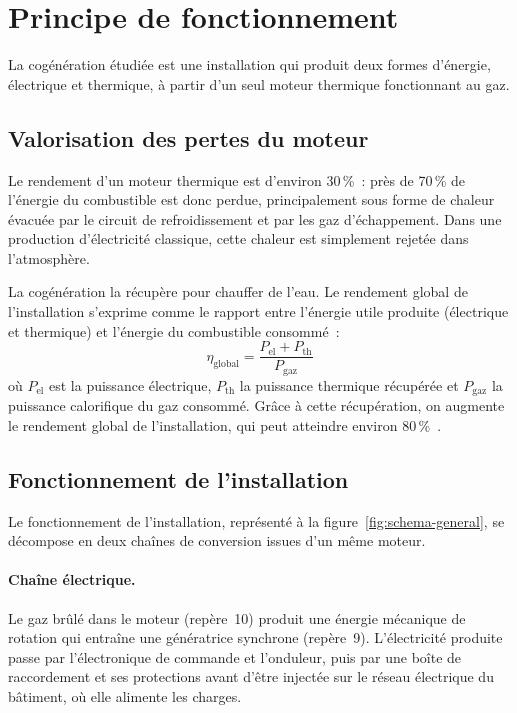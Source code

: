 \section{Principe de fonctionnement}
\label{sec:principe}

La cogénération étudiée est une installation qui produit deux formes d'énergie, électrique et thermique, à partir d'un seul moteur thermique fonctionnant au gaz.

\subsection{Valorisation des pertes du moteur}
\label{subsec:valorisation}

Le rendement d'un moteur thermique est d'environ 30\,\%~: près de 70\,\% de l'énergie du combustible est donc perdue, principalement sous forme de chaleur évacuée par le circuit de refroidissement et par les gaz d'échappement. Dans une production d'électricité classique, cette chaleur est simplement rejetée dans l'atmosphère.

La cogénération la récupère pour chauffer de l'eau. Le rendement global de l'installation s'exprime comme le rapport entre l'énergie utile produite (électrique et thermique) et l'énergie du combustible consommé~:
\begin{equation}
  \eta_{\mathrm{global}} = \frac{P_{\mathrm{el}} + P_{\mathrm{th}}}{P_{\mathrm{gaz}}}
\end{equation}
où $P_{\mathrm{el}}$ est la puissance électrique, $P_{\mathrm{th}}$ la puissance thermique récupérée et $P_{\mathrm{gaz}}$ la puissance calorifique du gaz consommé.
Grâce à cette récupération, on augmente le rendement global de l'installation, qui peut atteindre environ 80\,\%~\cite{picbleu}.
\subsection{Fonctionnement de l'installation}
\label{subsec:fonctionnement}

Le fonctionnement de l'installation, représenté à la figure~\ref{fig:schema-general}, se décompose en deux chaînes de conversion issues d'un même moteur.

\paragraph{Chaîne électrique.} Le gaz brûlé dans le moteur (repère~10) produit une énergie mécanique de rotation qui entraîne une génératrice synchrone (repère~9). L'électricité produite passe par l'électronique de commande et l'onduleur, puis par une boîte de raccordement et ses protections avant d'être injectée sur le réseau électrique du bâtiment, où elle alimente les charges.


